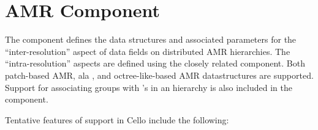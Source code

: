 \section{AMR Component} \label{s:component-amr}

The  component defines the data structures and associated
parameters for the ``inter-resolution'' aspect of data fields on
distributed AMR hierarchies.  The ``intra-resolution'' aspects are
defined using the closely related  component.  Both
patch-based AMR, ala \enzo, and octree-like-based AMR datastructures
are supported.  Support for associating  groups with
's in an  hierarchy is also included in the
 component.

Tentative features of  support in Cello include the following: 

